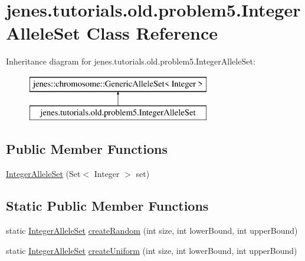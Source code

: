 \hypertarget{classjenes_1_1tutorials_1_1old_1_1problem5_1_1_integer_allele_set}{\section{jenes.\-tutorials.\-old.\-problem5.\-Integer\-Allele\-Set Class Reference}
\label{classjenes_1_1tutorials_1_1old_1_1problem5_1_1_integer_allele_set}
}
Inheritance diagram for jenes.\-tutorials.\-old.\-problem5.\-Integer\-Allele\-Set\-:\begin{figure}[H]
\begin{center}
\leavevmode
\includegraphics[height=2.000000cm]{classjenes_1_1tutorials_1_1old_1_1problem5_1_1_integer_allele_set}
\end{center}
\end{figure}
\subsection*{Public Member Functions}
\begin{DoxyCompactItemize}
\item 
\hyperlink{classjenes_1_1tutorials_1_1old_1_1problem5_1_1_integer_allele_set_a4bf775d640641b83dd1c53564b00f263}{Integer\-Allele\-Set} (Set$<$ Integer $>$ set)
\end{DoxyCompactItemize}
\subsection*{Static Public Member Functions}
\begin{DoxyCompactItemize}
\item 
static \hyperlink{classjenes_1_1tutorials_1_1old_1_1problem5_1_1_integer_allele_set}{Integer\-Allele\-Set} \hyperlink{classjenes_1_1tutorials_1_1old_1_1problem5_1_1_integer_allele_set_aab816bbf2219835d788ceb8b8a92007c}{create\-Random} (int size, int lower\-Bound, int upper\-Bound)
\item 
static \hyperlink{classjenes_1_1tutorials_1_1old_1_1problem5_1_1_integer_allele_set}{Integer\-Allele\-Set} \hyperlink{classjenes_1_1tutorials_1_1old_1_1problem5_1_1_integer_allele_set_af952e89dffc31630da0371be73bae906}{create\-Uniform} (int size, int lower\-Bound, int upper\-Bound)
\end{DoxyCompactItemize}


